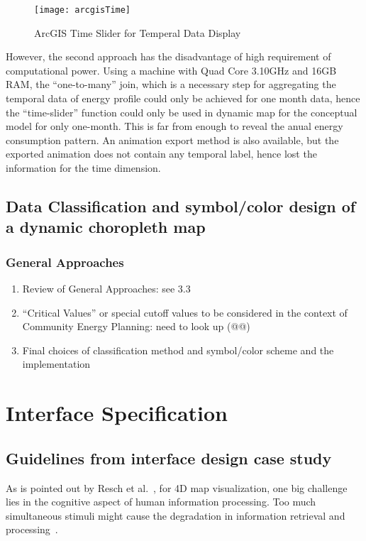 \documentclass[hidelinks,12pt]{article}
\begin{document}
\begin{figure}
  \centering
  \texttt{[image: arcgisTime]}
  \caption{ArcGIS Time Slider for Temperal Data Display}
  \label{fig:arcgisTime}
\end{figure}

However, the second approach has the disadvantage of high requirement
of computational power. Using a machine with Quad Core 3.10GHz and
16GB RAM, the ``one-to-many'' join, which is a necessary step for
aggregating the temporal data of energy profile could only be achieved
for one month data, hence the ``time-slider'' function could only be
used in dynamic map for the conceptual model for only one-month. This
is far from enough to reveal the anual energy consumption pattern. An
animation export method is also available, but the exported animation
does not contain any temporal label, hence lost the information for
the time dimension.
\subsection{Data Classification and symbol/color design of a
        dynamic choropleth map}
\subsubsection{General Approaches}
    \begin{enumerate}[label*=\arabic*.]
    \item Review of General Approaches: see 3.3
    \item ``Critical Values'' or special cutoff values to be
      considered in the context of Community Energy Planning: need to
      look up (@@)
    \item Final choices of classification method and symbol/color
      scheme and the implementation
    \end{enumerate}

\newpage
\section{Interface Specification}
\subsection{Guidelines from interface design case study}
As is pointed out by Resch et al.\ , for 4D map visualization, one big
challenge lies in the cognitive aspect of human information
processing. Too much simultaneous stimuli might cause the degradation
in information retrieval and processing~\cite{Resch2014}. 
\end{document}
